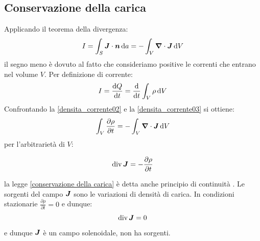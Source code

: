 \subsection{Conservazione della carica}
Applicando il teorema della divergenza:
\begin{equation}
I=\int_S \boldsymbol{J}\cdot\boldsymbol{n}\,\mathrm{d} a=-\int_V\boldsymbol{\nabla}\cdot\boldsymbol{J}\,\mathrm{d} V
\label{densita_corrente02}
\end{equation}
il segno meno è dovuto al fatto che consideriamo positive le correnti che entrano nel volume $V$. Per definizione di corrente:
\begin{equation}
I=\frac{\mathrm{d} Q}{\mathrm{d} t}=\frac{\mathrm{d}}{\mathrm{d} t}\int_V\rho\,\mathrm{d} V
\label{densita_corrente03}
\end{equation}
Confrontando la \eqref{densita_corrente02} e la \eqref{densita_corrente03} si ottiene:
\begin{equation*}\int_V\frac{\partial \rho}{\partial t}=-\int_V\boldsymbol{\nabla}\cdot\boldsymbol{J}\,\mathrm{d} V\end{equation*}
per l'arbitrarietà di $V$:
\begin{legge}
\begin{equation}
\operatorname{div}\boldsymbol{J}=-\frac{\partial \rho}{\partial t}
\end{equation}
\label{conservazione della carica}
\end{legge}
la legge \eqref{conservazione della carica} è detta anche principio di continuità . Le sorgenti del campo $\boldsymbol{J}$ sono le variazioni di densità di carica. In condizioni stazionarie $\frac{\partial\rho}{\partial t}=0$ e dunque:
\begin{equation*}\operatorname{div} \boldsymbol{J}=0\end{equation*}
e dunque $\boldsymbol{J}$ è un campo solenoidale, non ha sorgenti.
